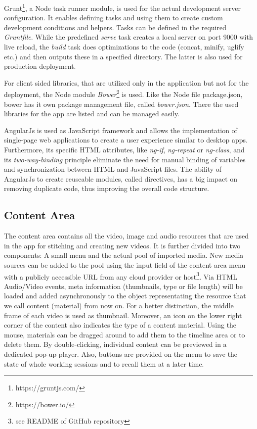 \documentclass[conference]{IEEEtran}
\begin{document}
Grunt\footnote{https://gruntjs.com/}, a Node task runner module, is used for the actual development server configuration.
It enables defining tasks and using them to create custom development conditions and helpers.
Tasks can be defined in the required \textit{Gruntfile}.
While the predefined \textit{serve} task creates a local server on port 9000 with live reload, the \textit{build} task does optimizations to the code (concat, minify, uglify etc.) and then outputs these in a specified directory.
The latter is also used for production deployment.

For client sided libraries, that are utilized only in the application but not for the deployment, the Node module \textit{Bower}\footnote{https://bower.io/} is used.
Like the Node file package.json, bower has it own package management file, called \textit{bower.json}.
There the used libraries for the app are listed and can be managed easily.

AngularJs is used as JavaScript framework and allows the implementation of single-page web applications to create a user experience similar to desktop apps.
Furthermore, its specific HTML attributes, like \textit{ng-if}, \textit{ng-repeat} or \textit{ng-class}, and its \textit{two-way-binding} principle eliminate the need for manual binding of variables and synchronization between HTML and JavaScript files.
The ability of AngularJs to create reuseable modules, called directives, has a big impact on removing duplicate code, thus improving the overall code structure.

\subsection{Content Area}
The content area contains all the video, image and audio resources that are used in the app for stitching and creating new videos.
It is further divided into two components: A small menu and the actual pool of imported media.
New media sources can be added to the pool using the input field of the content area menu with a publicly accessible URL from any cloud provider or host\footnote{see README of GitHub repository}.
Via HTML Audio/Video events, meta information (thumbnails, type or file length) will be loaded and added asynchronously to the object representating the resource that we call content (material) from now on.
For a better distinction, the middle frame of each video is used as thumbnail.
Moreover, an icon on the lower right corner of the content also indicates the type of a content material.
Using the mouse, materials can be dragged around to add them to the timeline area or to delete them.
By double-clicking, individual content can be previewed in a dedicated pop-up player.
Also, buttons are provided on the menu to save the state of whole working sessions and to recall them at a later time.
\end{document}
